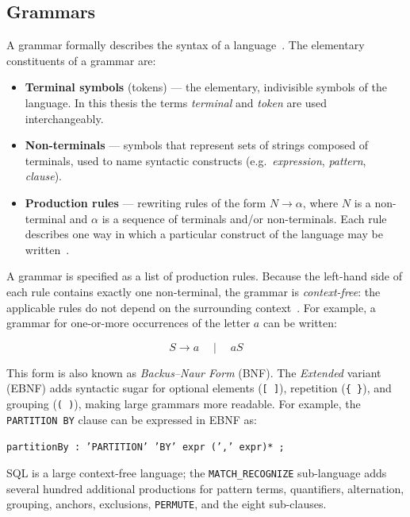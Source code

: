 \subsection{Grammars}
\label{subsec:meth-grammars}

A grammar formally describes the syntax of a language~\cite{DragonBook}.
The elementary constituents of a grammar are:

\begin{itemize}
  \item \textbf{Terminal symbols} (tokens) --- the elementary,
    indivisible symbols of the language.  In this thesis the terms
    \emph{terminal} and \emph{token} are used interchangeably.
  \item \textbf{Non-terminals} --- symbols that represent sets of
    strings composed of terminals, used to name syntactic constructs
    (e.g.\ \emph{expression}, \emph{pattern}, \emph{clause}).
  \item \textbf{Production rules} --- rewriting rules of the form
    $N \to \alpha$, where $N$ is a non-terminal and $\alpha$ is a
    sequence of terminals and/or non-terminals.  Each rule describes
    one way in which a particular construct of the language may be
    written~\cite{wagenknecht2022formal}.
\end{itemize}

A grammar is specified as a list of production rules.  Because the
left-hand side of each rule contains exactly one non-terminal, the
grammar is \emph{context-free}: the applicable rules do not depend
on the surrounding context~\cite{DragonBook}.  For example, a grammar
for one-or-more occurrences of the letter $a$ can be written:

\[
  S \to a \quad\mid\quad aS
\]

This form is also known as \emph{Backus--Naur Form} (BNF).
The \emph{Extended} variant (EBNF) adds syntactic sugar for
optional elements (\texttt{[~]}), repetition (\texttt{\{~\}}), and
grouping (\texttt{(~)}), making large grammars more readable.  For
example, the \texttt{PARTITION~BY} clause can be expressed in EBNF
as:

\begin{center}
  \texttt{partitionBy~:~'PARTITION'~'BY'~expr~(','\ expr)*~;}
\end{center}

SQL is a large context-free language; the \texttt{MATCH\_RECOGNIZE}
sub-language adds several hundred additional productions for pattern
terms, quantifiers, alternation, grouping, anchors, exclusions,
\texttt{PERMUTE}, and the eight sub-clauses.

